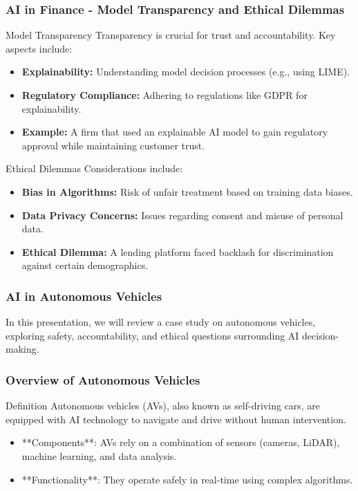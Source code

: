 \documentclass[aspectratio=169]{beamer}
\begin{document}
\begin{frame}[fragile]
    \frametitle{AI in Finance - Model Transparency and Ethical Dilemmas}
    \begin{block}{Model Transparency}
        Transparency is crucial for trust and accountability. Key aspects include:
        \begin{itemize}
            \item \textbf{Explainability:} Understanding model decision processes (e.g., using LIME).
            \item \textbf{Regulatory Compliance:} Adhering to regulations like GDPR for explainability.
        \end{itemize}
        \begin{itemize}
            \item \textbf{Example:} A firm that used an explainable AI model to gain regulatory approval while maintaining customer trust.
        \end{itemize}
    \end{block}

    \begin{block}{Ethical Dilemmas}
        Considerations include:
        \begin{itemize}
            \item \textbf{Bias in Algorithms:} Risk of unfair treatment based on training data biases.
            \item \textbf{Data Privacy Concerns:} Issues regarding consent and misuse of personal data.
        \end{itemize}
        \begin{itemize}
            \item \textbf{Ethical Dilemma:} A lending platform faced backlash for discrimination against certain demographics.
        \end{itemize}
    \end{block}
\end{frame}

\begin{frame}[fragile]
    \frametitle{AI in Autonomous Vehicles}
    In this presentation, we will review a case study on autonomous vehicles, exploring safety, accountability, and ethical questions surrounding AI decision-making.
\end{frame}

\begin{frame}[fragile]
    \frametitle{Overview of Autonomous Vehicles}
    \begin{block}{Definition}
        Autonomous vehicles (AVs), also known as self-driving cars, are equipped with AI technology to navigate and drive without human intervention.
    \end{block}
    
    \begin{itemize}
        \item **Components**: AVs rely on a combination of sensors (cameras, LiDAR), machine learning, and data analysis.
        \item **Functionality**: They operate safely in real-time using complex algorithms.
    \end{itemize}
\end{frame}
\end{document}
